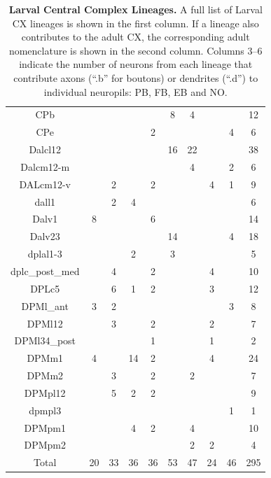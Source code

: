 \begin{table}
{\begin{tabular}{|c|c|c|c|c|c|c|c|c|c|}
    CPb &  &  &  &  & 8 & 4 &  &  & 12 \\
    CPe &  &  &  & 2 &  &  &  & 4 & 6 \\
    Dalcl12 &  &  &  &  & 16 & 22 &  &  & 38 \\
    Dalcm12-m &  &  &  &  &  & 4 &  & 2 & 6 \\
    DALcm12-v &  & 2 &  & 2 &  &  & 4 & 1 & 9 \\
    dall1 &  & 2 & 4 &  &  &  &  &  & 6 \\
    Dalv1 & 8 &  &  & 6 &  &  &  &  & 14 \\
    Dalv23 &  &  &  &  & 14 &  &  & 4 & 18 \\
    dplal1-3 &  &  & 2 &  & 3 &  &  &  & 5 \\
    dplc\_post\_med &  & 4 &  & 2 &  &  & 4 &  & 10 \\
    DPLc5 &  & 6 & 1 & 2 &  &  & 3 &  & 12 \\
    DPMl\_ant & 3 & 2 &  &  &  &  &  & 3 & 8 \\
    DPMl12 &  & 3 &  & 2 &  &  & 2 &  & 7 \\
    DPMl34\_post &  &  &  & 1 &  &  & 1 &  & 2 \\
    DPMm1 & 4 &  & 14 & 2 &  &  & 4 &  & 24 \\
    DPMm2 &  & 3 &  & 2 &  & 2 &  &  & 7 \\
    DPMpl12 &  & 5 & 2 & 2 &  &  &  &  & 9 \\
    dpmpl3 &  &  &  &  &  &  &  & 1 & 1 \\
    DPMpm1 &  &  & 4 & 2 &  & 4 &  &  & 10 \\
    DPMpm2 &  &  &  &  &  & 2 & 2 &  & 4 \\
    \bottomrule
    Total & 20 & 33 & 36 & 36 & 53 & 47 & 24 & 46 & 295 \\
    \bottomrule
    \end{tabular}
    }
    \caption[Larval Central Complex Lineages]{\textbf{Larval Central Complex Lineages.} A full list of Larval CX lineages is shown in the first column. If a lineage also contributes to the adult CX, the corresponding adult nomenclature \citep{eckstein2024neurotransmitter} is shown in the second column. Columns 3--6 indicate the number of neurons from each lineage that contribute axons (“.b” for boutons) or dendrites (“.d”) to individual neuropils: PB, FB, EB and NO.}
    \label{larvallineages}
    \end{table}


